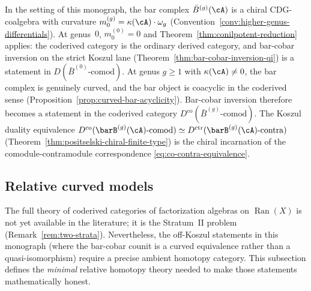 \begin{remark}
\label{rem:coderived-bar-cobar}
In the setting of this monograph, the bar complex
$\bar{B}^{(g)}(\cA)$ is a chiral CDG-coalgebra with curvature
$m_0^{(g)} = \kappa(\cA) \cdot \omega_g$
(Convention~\ref{conv:higher-genus-differentials}).
At genus~$0$, $m_0^{(0)} = 0$ and
Theorem~\ref{thm:conilpotent-reduction} applies: the coderived
category is the ordinary derived category, and bar-cobar
inversion on the strict Koszul lane
\textup{(}Theorem~\ref{thm:bar-cobar-inversion-qi}\textup{)}
is a statement in $D(\bar{B}^{(0)}\text{-}\mathrm{comod})$.
At genus $g \geq 1$ with $\kappa(\cA) \neq 0$, the bar complex
is genuinely curved, and the bar object is coacyclic in the
coderived sense
\textup{(}Proposition~\ref{prop:curved-bar-acyclicity}\textup{)}.
Bar-cobar inversion therefore becomes a statement in the
coderived category
$D^{\mathrm{co}}(\bar{B}^{(g)}\text{-}\mathrm{comod})$.
The Koszul duality equivalence
$D^{\mathrm{co}}(\barB^{(g)}(\cA)\text{-}\mathrm{comod})
\simeq D^{\mathrm{ctr}}(\barB^{(g)}(\cA)\text{-}\mathrm{contra})$
\textup{(}Theorem~\ref{thm:positselski-chiral-finite-type}\textup{)} is the chiral
incarnation of the comodule-contramodule correspondence
\eqref{eq:co-contra-equivalence}.
\end{remark}


\subsection{Relative curved models}
\label{sec:coderived-models}

The full theory of coderived categories of factorization algebras
on $\operatorname{Ran}(X)$ is not yet available in the literature;
it is the Stratum~II problem
(Remark~\ref{rem:two-strata}). Nevertheless, the off-Koszul
statements in this monograph (where the bar-cobar counit is
a curved equivalence rather than a quasi-isomorphism) require
a precise ambient homotopy category. This subsection defines the
\emph{minimal} relative homotopy theory needed to make those
statements mathematically honest.

